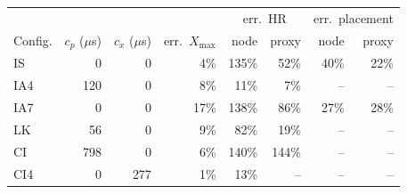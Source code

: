 \begin{tabular}{lrrrrrrr}
\toprule
 & & & & \multicolumn{2}{c}{err.\ HR} & \multicolumn{2}{c}{err.\ placement} \\
Config. & $c_p$ ($\mu$s) & $c_x$ ($\mu$s) & err.\ $X_{\max}$ & node & proxy & node & proxy \\
\midrule
IS & 0 & 0 & 4\% & 135\% & 52\% & 40\% & 22\% \\
IA4 & 120 & 0 & 8\% & 11\% & 7\% & -- & -- \\
IA7 & 0 & 0 & 17\% & 138\% & 86\% & 27\% & 28\% \\
LK & 56 & 0 & 9\% & 82\% & 19\% & -- & -- \\
CI & 798 & 0 & 6\% & 140\% & 144\% & -- & -- \\
CI4 & 0 & 277 & 1\% & 13\% & -- & -- & -- \\
\bottomrule
\end{tabular}
